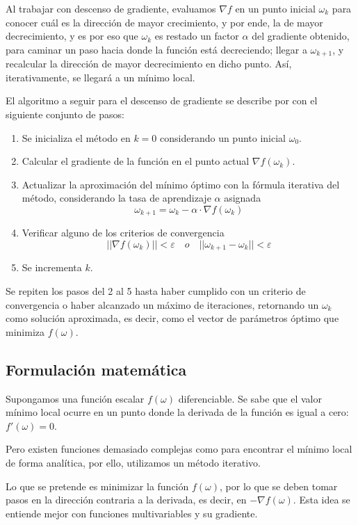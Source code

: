 \documentclass[conference]{IEEEtran}
\begin{document}
Al trabajar con descenso de gradiente, evaluamos $\nabla f$ en un punto inicial $\omega_{k}$ para conocer cuál es la dirección de mayor crecimiento, y por ende, la de mayor decrecimiento, y es por eso que $\omega_{k}$ es restado un factor $\alpha$ del gradiente obtenido, para caminar un paso hacia donde la función está decreciendo; llegar a $\omega_{k+1}$, y recalcular la dirección de mayor decrecimiento en dicho punto. Así, iterativamente, se llegará a un mínimo local.

El algoritmo a seguir para el descenso de gradiente se describe por con el siguiente conjunto de pasos:
\begin{enumerate}
    \item Se inicializa el método en $k=0$ considerando un punto inicial $\omega_0$. 
    \item Calcular el gradiente de la función en el punto actual $\nabla f(\omega_k)$.
    \item Actualizar la aproximación del mínimo óptimo con la fórmula iterativa del método, considerando la tasa de aprendizaje $\alpha$ asignada $$\omega_{k+1}=\omega_{k}-\alpha \cdot \nabla f(\omega_{k})$$
    \item Verificar alguno de los criterios de convergencia $$\lvert\lvert \nabla f(\omega_{k}) \rvert\rvert < \varepsilon \quad o\quad \lvert \lvert \omega_{k+1}-\omega_{k} \rvert  \rvert <\varepsilon$$
    \item Se incrementa $k$.
\end{enumerate}
Se repiten los pasos del 2 al 5 hasta haber cumplido con un criterio de convergencia o haber alcanzado un máximo de iteraciones, retornando un $\omega_k$ como solución aproximada, es decir, como el vector de parámetros óptimo que minimiza $f(\omega)$.

\subsection{Formulación matemática}\label{sec1:2}
Supongamos una función escalar $f(\omega)$ diferenciable. Se sabe que el valor mínimo local ocurre en un punto donde la derivada de la función es igual a cero: $f'(\omega) = 0$.

Pero existen funciones demasiado complejas como para encontrar el mínimo local de forma analítica, por ello, utilizamos un método iterativo.

Lo que se pretende es minimizar la función $f(\omega)$, por lo que se deben tomar pasos en la dirección contraria a la derivada, es decir, en $-\nabla f(\omega)$. Esta idea se entiende mejor con funciones multivariables y su gradiente.
\end{document}
